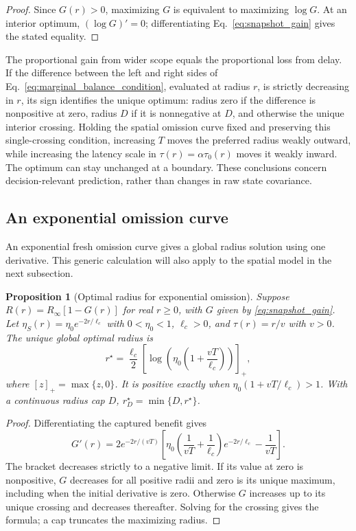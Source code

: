 \documentclass[11pt]{article}
\newtheorem{proposition}{Proposition}
\begin{document}
\begin{proof}
Since $G(r)>0$, maximizing $G$ is equivalent to maximizing $\log G$.
At an interior optimum, $(\log G)'=0$; differentiating
Eq.~\eqref{eq:snapshot_gain} gives the stated equality.
\end{proof}

The proportional gain from wider scope equals the proportional loss from
delay. If the difference between the left and right sides of
Eq.~\eqref{eq:marginal_balance_condition}, evaluated at radius $r$, is
strictly decreasing in $r$, its sign identifies the unique optimum:
radius zero if the difference is nonpositive at zero, radius $D$ if it is
nonnegative at $D$, and otherwise the unique interior crossing.
Holding the spatial omission curve fixed and preserving this single-crossing
condition, increasing $T$ moves the preferred radius weakly outward, while
increasing the latency scale in $\tau(r)=\alpha\tau_0(r)$ moves it weakly inward.
The optimum can stay unchanged at a boundary. These conclusions concern
decision-relevant prediction, rather than changes in raw state covariance.

\subsection{An exponential omission curve}

An exponential fresh omission curve gives a global radius solution using
one derivative. This generic calculation will also apply to the spatial
model in the next subsection.

\begin{proposition}[Optimal radius for exponential omission]
\label{prop:generic_exponential_radius}
Suppose $R(r)=R_\infty[1-G(r)]$ for real $r\ge0$, with $G$ given by
\eqref{eq:snapshot_gain}. Let
$\eta_S(r)=\eta_0e^{-2r/\ell_c}$ with $0<\eta_0<1$, $\ell_c>0$,
and $\tau(r)=r/v$ with $v>0$. The unique global
optimal radius is
\begin{equation}
\boxed{r^\star=\frac{\ell_c}{2}
\left[\log\!\left(\eta_0\left(1+\frac{vT}{\ell_c}\right)\right)\right]_+,}
\label{eq:generic_exponential_rstar}
\end{equation}
where $[z]_+=\max\{z,0\}$. It is positive exactly when
$\eta_0(1+vT/\ell_c)>1$. With a continuous radius cap $D$,
$r_D^\star=\min\{D,r^\star\}$.
\end{proposition}
\begin{proof}
Differentiating the captured benefit gives
\[
G'(r)=2e^{-2r/(vT)}\left[
\eta_0\left(\frac{1}{vT}+\frac{1}{\ell_c}\right)e^{-2r/\ell_c}
-\frac{1}{vT}\right].
\]
The bracket decreases strictly to a negative limit. If its value at zero
is nonpositive, $G$ decreases for all positive radii and zero is its unique
maximum, including when the initial derivative is zero. Otherwise $G$
increases up to its unique crossing and decreases thereafter. Solving for
the crossing gives the formula; a cap truncates the maximizing radius.
\end{proof}
\end{document}
